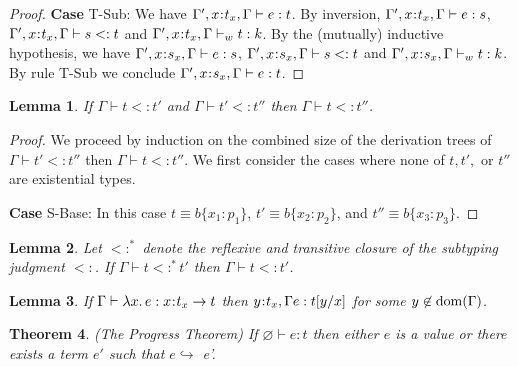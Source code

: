 \documentclass[11pt]{article}
\newtheorem{theorem}{Theorem}%
\newtheorem{lemma}[theorem]{Lemma}
\newcommand{\bind}{\hspace{0.05em}{:}\hspace{0.05em}} %
\newcommand{\col}{\mathbin{:}}       %
\newcommand{\functype}[3]{#1\bind #2 \rightarrow #3}
\newcommand{\dom}[1]{{\rm dom}(#1)}
\begin{document}
\begin{proof}
{\bf Case} {\sc T-Sub}: We have $\Gamma', x\bind t_x, \Gamma \vdash e : t$. By inversion, $\Gamma', x\bind t_x, \Gamma \vdash e : s$, $\Gamma', x\bind t_x, \Gamma \vdash s <: t$ and $\Gamma', x\bind t_x, \Gamma \vdash_w t : k$. By the (mutually) inductive hypothesis, we have $\Gamma', x\bind s_x, \Gamma \vdash e : s$, $\Gamma', x\bind s_x, \Gamma \vdash s <: t$ and $\Gamma', x\bind s_x, \Gamma \vdash_w t : k$. By rule {\sc T-Sub} we conclude $\Gamma', x\bind s_x, \Gamma \vdash e : t$.

\end{proof}

\begin{lemma}\label{sub-trans}
If $\Gamma \vdash t <: t'$ and $\Gamma \vdash t' <: t''$ then $\Gamma \vdash t <: t''$.
\end{lemma}

\begin{proof}
We proceed by induction on the combined size of the derivation trees of $\Gamma \vdash t' <: t''$ then $\Gamma \vdash t <: t''$. We first consider the cases where none of $t, t',$ or $t''$ are existential types. 

{\bf Case} {\sc S-Base}: In this case $t \equiv b\{x_1\col p_1\}$, $t' \equiv b\{x_2\col p_2\}$, and $t'' \equiv b\{x_3\col p_3\}$.

\end{proof}

\begin{lemma}\label{sub-closure}
Let $<:^*$ denote the reflexive and transitive closure of the subtyping judgment $<:$. If $\Gamma \vdash t <:^* t'$ then $\Gamma \vdash t <: t'$.
\end{lemma}

\begin{lemma}\label{invert-app}
If $\Gamma \vdash \lambda x.\, e : \functype{x}{t_x}{t}$ then $y\bind t_x, \Gamma e : t[y/x]$ for some $y\not\in\dom{\Gamma}$.
\end{lemma}

\begin{theorem}\label{progress}
(The Progress Theorem) If $\varnothing \vdash e : t$ then either $e$ is a value or there exists a term $e'$ such that $e \hookrightarrow$ e'.
\end{theorem}
\end{document}
